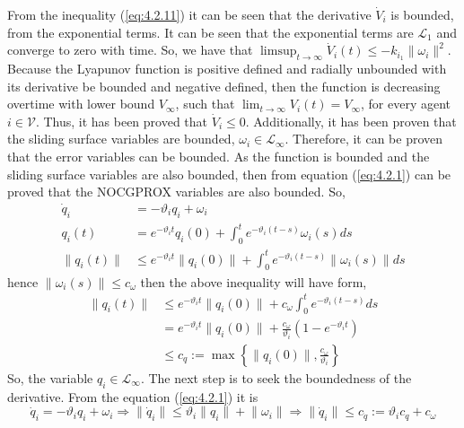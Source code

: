     From the inequality (\ref{eq:4.2.11}) it can be seen that the derivative $\dot{V}_i$ is bounded, from the exponential terms. It can be seen that the exponential terms are $\mathcal{L}_1$ and converge to zero with time. So, we have that $\limsup_{t \to \infty} \dot{V}_i(t) \leq  -k_{i_1} \lVert \omega_i \rVert^2$. Because the Lyapunov function is positive defined and radially unbounded with its derivative be bounded and negative defined, then the function is decreasing overtime with lower bound $V_{\infty}$, such that $\lim_{t \to \infty} V_i(t) = V_{\infty}$, for every agent $i \in \mathcal{V}$. Thus, it has been proved that $\dot{V}_i \leq 0$. Additionally, it has been proven that the sliding surface variables are bounded, $\omega_i \in \mathcal{L}_{\infty}$. Therefore, it can be proven that the error variables can be bounded. As the function is bounded and the sliding surface variables are also bounded, then from equation (\ref{eq:4.2.1}) can be proved that the NOCGPROX variables are also bounded. So,
    \begin{equation*}
        \begin{align}
            \dot{q}_i &= -\vartheta_i q_i + \omega_i\\
            q_i(t) &= e^{-\vartheta_i t}q_i(0) + \int_{0}^{t} e^{-\vartheta_i (t - s)} \omega_i (s) ds\\
            \lVert q_i(t) \rVert & \leq e^{-\vartheta_i t} \lVert q_i(0) \rVert + \int_{0}^{t} e^{-\vartheta_i (t - s)} \lVert \omega_i (s) \rVert ds
        \end{align}
    \end{equation*}
    hence $\lVert \omega_i(s) \rVert \leq c_{\omega}$ then the above inequality will have form,
    \begin{equation*}
        \begin{align}
            \lVert q_i(t) \rVert & \leq e^{-\vartheta_i t} \lVert q_i(0) \rVert + c_{\omega}\int_{0}^{t} e^{-\vartheta_i (t - s)} ds\\
            &= e^{-\vartheta_i t} \lVert q_i(0) \rVert + \frac{c_{\omega}}{\vartheta_i}(1 - e^{-\vartheta_i t})\\
            &\leq c_q := \max \left\{\lVert q_i(0) \rVert,  \frac{c_{\omega}}{\vartheta_i}\right\}
        \end{align}
    \end{equation*}
    So, the variable $q_i \in \mathcal{L}_{\infty}$. The next step is to seek the boundedness of the derivative. From the equation (\ref{eq:4.2.1}) it is
    \begin{equation*}
        \dot{q}_i = -\vartheta_i q_i + \omega_i \Rightarrow \lVert \dot{q}_i \rVert \leq \vartheta_i \lVert q_i \rVert + \lVert \omega_i \rVert \Rightarrow \lVert \dot{q}_i \rVert \leq c_{\dot{q}} := \vartheta_i c_q + c_{\omega}
    \end{equation*}
